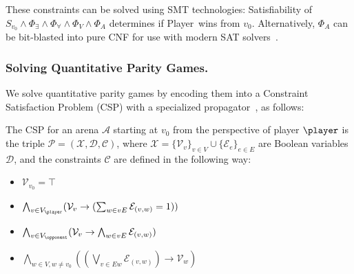 \documentclass[a4paper,UKenglish,cleveref, autoref, thm-restate, anonymous]{lipics-v2021}
\begin{document}
These constraints can be solved using SMT technologies: Satisfiability of $S_{v_0} \wedge \Phi_\exists \wedge \Phi_\forall \wedge \Phi_V \wedge \Phi_A$ determines if Player~\even wins from $v_0$. Alternatively, $\Phi_A$ can be bit-blasted into pure CNF for use with modern SAT solvers~\cite{Heljanko:2012}.

\subsubsection{Solving Quantitative Parity Games.}
We solve quantitative parity games by encoding them into a Constraint Satisfaction Problem (CSP) with a specialized propagator~\cite{Hernandez:2026:noc}, as follows: 

\begin{definition}\label{def:csp}
    The CSP for an arena $\mathcal{A}$
    starting at $v_0$ from the perspective of player $\player$ is the triple $\mathcal{P} = (\mathcal{X}, \mathcal{D}, \mathcal{C})$, where $\mathcal{X} = \{ \mathcal{V}_v \}_{v \in V} \cup \{ \mathcal{E}_e \}_{e \in E}$ are Boolean variables $\mathcal{D}$, and the constraints $\mathcal{C}$ are defined in the following way:
    \begin{itemize}[leftmargin=2.5cm, labelwidth=1.7cm, align=left, itemsep=1.0ex, parsep=0pt]

        \item [$\mathcal{C}_{v_0}$ :] $\mathcal{V}_{v_0} = \top$

        \item [$\mathcal{C}_{\player}$ :] $\bigwedge_{v \in V_{\player}} (\mathcal{V}_v \rightarrow (\sum_{w \in vE} \mathcal{E}_{(v,w)}= 1))$

        \item [$\mathcal{C}_{\opponent}$ :] $\bigwedge_{v \in V_{\opponent}} (\mathcal{V}_v \rightarrow \bigwedge_{w \in vE} \mathcal{E}_{(v,w)})$

        \item [$\mathcal{C}_{\!E}$ :] $\bigwedge_{w \in V, w \neq v_0} ((\bigvee_{v \in Ew} \mathcal{E}_{(v,w)}) \rightarrow \mathcal{V}_w)$

        

\end{itemize}
\end{definition}
\end{document}
